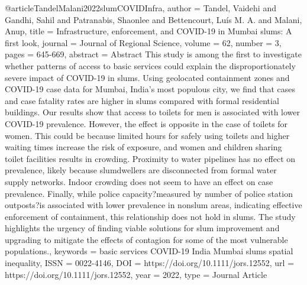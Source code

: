 {{{{@article{TandelMalani2022slumCOVIDInfra,
   author = {Tandel, Vaidehi and Gandhi, Sahil and Patranabis, Shaonlee and Bettencourt, Luís M. A. and Malani, Anup},
   title = {Infrastructure, enforcement, and COVID-19 in Mumbai slums: A first look},
   journal = {Journal of Regional Science},
   volume = {62},
   number = {3},
   pages = {645-669},
   abstract = {Abstract This study is among the first to investigate whether patterns of access to basic services could explain the disproportionately severe impact of COVID-19 in slums. Using geolocated containment zones and COVID-19 case data for Mumbai, India's most populous city, we find that cases and case fatality rates are higher in slums compared with formal residential buildings. Our results show that access to toilets for men is associated with lower COVID-19 prevalence. However, the effect is opposite in the case of toilets for women. This could be because limited hours for safely using toilets and higher waiting times increase the risk of exposure, and women and children sharing toilet facilities results in crowding. Proximity to water pipelines has no effect on prevalence, likely because slumdwellers are disconnected from formal water supply networks. Indoor crowding does not seem to have an effect on case prevalence. Finally, while police capacity?measured by number of police station outposts?is associated with lower prevalence in nonslum areas, indicating effective enforcement of containment, this relationship does not hold in slums. The study highlights the urgency of finding viable solutions for slum improvement and upgrading to mitigate the effects of contagion for some of the most vulnerable populations.},
   keywords = {basic services
COVID-19
India
Mumbai
slums
spatial inequality},
   ISSN = {0022-4146},
   DOI = {https://doi.org/10.1111/jors.12552},
   url = {https://doi.org/10.1111/jors.12552},
   year = {2022},
   type = {Journal Article}
}



}}}}
